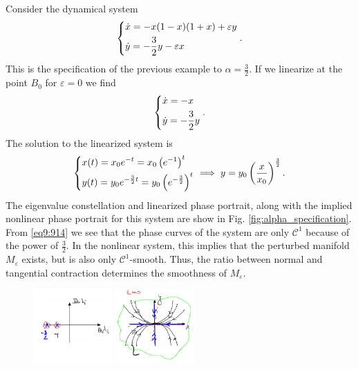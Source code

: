 \begin{ex}[]
	Consider the dynamical system
	\begin{align}
		\begin{dcases}
			\dot{x} = -x(1-x)(1+x) + \varepsilon y \\
			\dot{y} = - \frac{3}{2} y - \varepsilon x
		\end{dcases}
.		
	\end{align}
	This is the specification of the previous example to $\alpha = \frac{3}{2}$. If we linearize at the point $B_0$ for $\varepsilon = 0 $ we find
	\begin{align}
	\begin{dcases}
		\dot{x} = - x \\
		\dot{y} = -\frac{3}{2} y
	\end{dcases}
	.	
	\end{align}
	The solution to the linearized system is
	\begin{align}
		\begin{dcases}
			x(t) = x_0 e^{-t} = x_0 \left(e^{-1} \right)^{t} \\
			y(t) = y_0 e^{-\frac{3}{2}t} = y_0 \left(e^{-\frac{3}{2}}\right)^{t}
		\end{dcases}
		\implies y = y_0 \left(\frac{x}{x_0}\right)^{\frac{3}{2}}. \label{eq9:914}
	\end{align}
	The eigenvalue constellation and linearized phase portrait, along with the implied nonlinear phase portrait for this system are show in Fig. \ref{fig:alpha_specification}. From \eqref{eq9:914} we see that the phase curves of the system are only $\mathcal{C}^1$ because of the power of $\frac{3}{2}$. In the nonlinear system, this implies that the perturbed manifold $M_\varepsilon$ exists, but is also only $\mathcal{C}^1$-smooth. Thus, the ratio between normal and tangential contraction determines the smoothness of $M_\varepsilon$.
	\begin{figure}[h!]
		\centering
		\includegraphics[width=0.27\textwidth]{figures/ch9/12alpha_specification_1.png}
		\includegraphics[width=0.27\textwidth]{figures/ch9/12alpha_specification_2.png}

\end{figure}
\end{ex}
